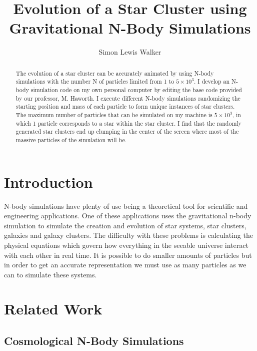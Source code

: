\documentclass{egpubl}
\title[Evolution of a Star Cluster using Gravitational N-Body Simulations]%
      {Evolution of a Star Cluster using Gravitational N-Body Simulations}
\author[S. Walker]
	{Simon Lewis Walker}
\begin{document}

\maketitle
\begin{abstract}
The evolution of a star cluster can be accurately animated by using N-body simulations with the number N of particles limited from 1 to $5\times10^3$. I develop an N-body simulation code on my own personal computer by editing the base code provided by our professor, M. Haworth. I execute different N-body simulations randomizing the starting position and mass of each particle to form unique instances of star clusters. The maximum number of particles that can be simulated on my machine is $5\times10^3$, in which 1 particle corresponds to a star within the star cluster. I find that the randomly generated star clusters end up clumping in the center of the screen where most of the massive particles of the simulation will be.
\end{abstract}  
\section{Introduction}

    N-body simulations have plenty of use being a theoretical tool for scientific and engineering applications. One of these applications uses the gravitational n-body simulation to simulate the creation and evolution of star systems, star clusters, galaxies and galaxy clusters. The difficulty with these problems is calculating the physical equations which govern how everything in the seeable universe interact with each other in real time. It is possible to do smaller amounts of particles but in order to get an accurate representation we must use as many particles as we can to simulate these systems.

\section{Related Work}

\subsection{Cosmological N-Body Simulations}
\end{document}
